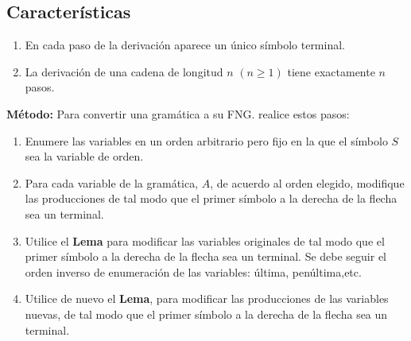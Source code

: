 \subsection{Características}
\begin{enumerate}
\item En cada paso de la derivación aparece un único símbolo terminal.
\item La derivación de una cadena de longitud $n$ $(n\geq 1)$ tiene exactamente $n$ pasos.
\end{enumerate}
\textbf{Método: }Para convertir una gramática a su FNG. realice estos pasos:
\begin{enumerate}
\item Enumere las variables en un orden arbitrario pero fijo en la que el símbolo $S$ sea la variable de orden.
\item Para cada variable de la gramática, $A$, de acuerdo al orden elegido, modifique las producciones de tal modo que el primer símbolo a la derecha de la flecha sea un terminal.
\item Utilice el \textbf{Lema} para modificar las variables originales de tal modo que el primer símbolo a la derecha de la flecha sea un terminal. Se debe seguir el orden inverso de enumeración de las variables: última, penúltima,etc.
\item Utilice de nuevo el \textbf{Lema}, para modificar las producciones de las variables nuevas, de tal modo que el primer símbolo a la derecha de la flecha sea un terminal.
\end{enumerate}

